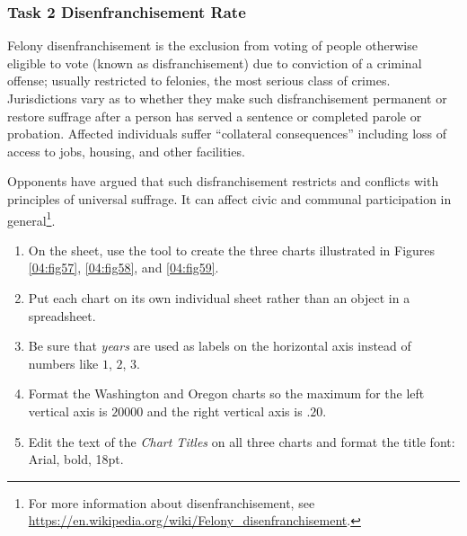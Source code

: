 \subsubsection{Task 2 Disenfranchisement Rate}

Felony disenfranchisement is the exclusion from voting of people otherwise eligible to vote (known as disfranchisement) due to conviction of a criminal offense; usually restricted to felonies, the most serious class of crimes. Jurisdictions vary as to whether they make such disfranchisement permanent or restore suffrage after a person has served a sentence or completed parole or probation. Affected individuals suffer ``collateral consequences'' including loss of access to jobs, housing, and other facilities.

Opponents have argued that such disfranchisement restricts and conflicts with principles of universal suffrage. It can affect civic and communal participation in general\footnote{For more information about disenfranchisement, see \url{https://en.wikipedia.org/wiki/Felony_disenfranchisement}.}.

\begin{enumbox}
	\begin{enumerate}
		\item On the  sheet, use the  tool to create the three charts illustrated in Figures \ref{04:fig57}, \ref{04:fig58}, and \ref{04:fig59}. 
		\item Put each chart on its own individual sheet rather than an object in a spreadsheet.
		\item Be sure that \textit{years} are used as labels on the horizontal axis instead of numbers like $ 1 $, $ 2 $, $ 3 $. 
		\item Format the Washington and Oregon charts so the maximum for the left vertical axis is $ 20000 $ and the right vertical axis is $ .20 $. 
		\item Edit the text of the \textit{Chart Titles} on all three charts and format the title font: Arial, bold, 18pt.
	\end{enumerate}
\end{enumbox}
	
